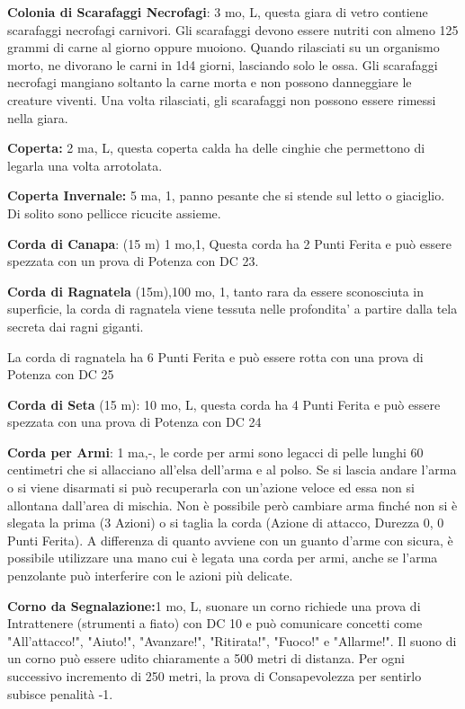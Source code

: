 \documentclass[a4paper,11pt,twoside,openany]{book}
\begin{document}
{\textbf{Colonia di Scarafaggi Necrofagi}: 3 mo, L, questa giara di vetro contiene scarafaggi necrofagi carnivori. Gli scarafaggi devono essere nutriti con almeno 125 grammi di carne al giorno oppure muoiono. Quando rilasciati su un organismo morto, ne divorano le carni in 1d4 giorni, lasciando solo le ossa. Gli scarafaggi necrofagi mangiano soltanto la carne morta e non possono danneggiare le creature viventi. Una volta rilasciati, gli scarafaggi non possono essere rimessi nella giara.

\textbf{Coperta:} 2 ma, L, questa coperta calda ha delle cinghie che permettono di legarla una volta arrotolata.

\textbf{Coperta Invernale:} 5 ma, 1, panno pesante che si stende sul letto o giaciglio. Di solito sono pellicce ricucite assieme.

\textbf{Corda di Canapa}: (15 m) 1 mo,1, Questa corda ha 2 Punti Ferita e può essere spezzata con un prova di Potenza con DC 23.

\textbf{Corda di Ragnatela} (15m),100 mo, 1, tanto rara da essere sconosciuta in superficie, la corda di ragnatela viene tessuta nelle profondita’ a partire dalla tela secreta dai ragni giganti.

La corda di ragnatela ha 6 Punti Ferita e può essere rotta con una prova di Potenza con DC 25

\textbf{Corda di Seta} (15 m): 10 mo, L, questa corda ha 4 Punti Ferita e può essere spezzata con una prova di Potenza con DC 24

\textbf{Corda per Armi}: 1 ma,-, le corde per armi sono legacci di pelle lunghi 60 centimetri che si allacciano all’elsa dell’arma e al polso. Se si lascia andare l’arma o si viene disarmati si può recuperarla con un’azione veloce ed essa non si allontana dall’area di mischia. Non è possibile però cambiare arma finché non si è slegata la prima (3 Azioni) o si taglia la corda (Azione di attacco, Durezza 0, 0 Punti Ferita). A differenza di quanto avviene con un guanto d’arme con sicura, è possibile utilizzare una mano cui è legata una corda per armi, anche se l’arma penzolante può interferire con le azioni più delicate.

\textbf{Corno da Segnalazione:}1 mo, L, suonare un corno richiede una prova di Intrattenere (strumenti a fiato) con DC 10 e può comunicare concetti come "All'attacco!", "Aiuto!", "Avanzare!", "Ritirata!", "Fuoco!" e "Allarme!". Il suono di un corno può essere udito chiaramente a 500 metri di distanza. Per ogni successivo incremento di 250 metri, la prova di Consapevolezza per sentirlo subisce penalità -1.

}
\end{document}
